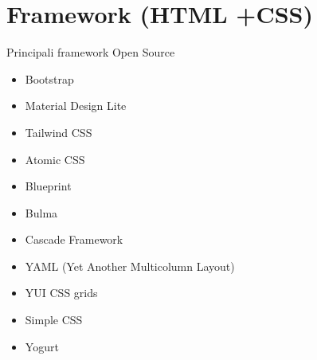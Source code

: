 \section[Framework]{Framework (HTML +CSS)}
\begin{frame}[fragile]{Principali framework Open Source}\transfade\centering
\begin{itemize}
  \item Bootstrap
  \item Material Design Lite
  \item Tailwind CSS
  \item Atomic CSS
  \item Blueprint
  \item Bulma
  \item Cascade Framework
  \item YAML (Yet Another Multicolumn Layout)
  \item YUI CSS grids
  \item Simple CSS
  \item Yogurt
\end{itemize}
\end{frame}
